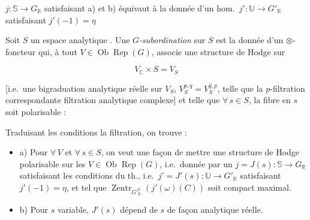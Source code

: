 \documentclass[11pt,a4paper]{article}
\begin{document}

$j : \mathbb{S} \to G_{\mathbb{R}}$ \struck{\ill{}} satisfaisant a) et b)
équivaut à la donnée d'un hom.\ $j' : \mathbb{U} \to G'_{\mathbb{R}}$
satisfaisant $j'(-1) = \eta$





Soit $S$ un espace analytique  . Une
\emph{$G$-subordination} sur $S$ est la donnée d'un $\otimes$-foncteur qui, à
tout $V \in \operatorname{Ob} \operatorname{Rep}(G)$, associe une structure de
Hodge  sur

\[ V_{\mathbb{C}} \times S = V_{S} \]

[i.e.\ une bigraduation \struck{\ill{}} analytique réelle \struck{\ill{}} sur
$V_{S}$, $V_{S}^{p,q} = \overline{V_{S}^{q,p}}$, telle que la $p$-filtration
correspondante \ill{} filtration analytique complexe]  et telle que $\forall\, s \in S$, la fibre en $s$ soit polarisable :
\struck{\ill{}}



Traduisant \ill{} les conditions \ill{} la filtration, on trouve :

\begin{itemize}
  \item a) Pour $\forall\, V$ et $\forall\, s \in S$, on veut une façon
      de mettre une structure de Hodge
     polarisable sur les $V \in \operatorname{Ob}
    \operatorname{Rep}(G)$, i.e.\ donnée par un
    $j = J(s) : \mathbb{S} \to G_{\mathbb{R}}$ satisfaisant les conditions du
    th., i.e.\ $j' = J'(s) : \mathbb{U} \to G'_{\mathbb{R}}$ satisfaisant
    $j'(-1) = \eta$, et tel que
    $\operatorname{Zentr}_{{G'}^{0}_{\mathbb{R}}}(j'(\omega)(C))$ soit compact
    maximal.
  \item b) Pour $s$ variable, $J'(s)$ dépend de $s$ de façon analytique réelle.
\end{itemize}
\end{document}
